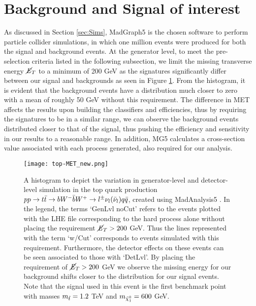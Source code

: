 \section{Background and Signal of interest}
\label{sec:production}
As discussed in Section \ref{sec:Sims}, MadGraph5 is the chosen software to perform particle collider simulations, in which one million events were produced for both the signal and background events. At the generator level, to meet the pre-selection criteria listed in the following subsection, we limit the missing transverse energy $\cancel{\it{E}}_{T}$ to a minimum of 200 GeV as the signatures significantly differ between our signal and backgrounds as seen in Figure \ref{fig:topMET}. From the histogram, it is evident that the background events have a distribution much closer to zero with a mean of roughly 50 GeV without this requirement. The difference in MET affects the results upon building the classifiers and efficiencies, thus by requiring the signatures to be in a similar range, we can observe the background events distributed closer to that of the signal, thus pushing the efficiency and sensitivity in our results to a reasonable range. In addition, MG5 calculates a cross-section value associated with each process generated, also required for our analysis. \\

\begin{figure}[htbp]
    \centering
    \texttt{[image: top-MET\_new.png]}
    \caption{A histogram to depict the variation in generator-level and detector-level simulation in the top quark production $pp \rightarrow t\Bar{t} \rightarrow bW^{-}\Bar{b}W^{+} \rightarrow l^{\pm}\nu_l(\Bar{\nu}_l)q\Bar{q}$, created using MadAnalysis5 \cite{conte2013madanalysis, conte2014designing, dumont2015toward}. In the legend, the terms `GenLvl noCut' refers to the events plotted with the LHE file corresponding to the hard process alone without placing the requirement $\cancel{\it{E}}_{T}>200$ GeV. Thus the lines represented with the term `w/Cut' corresponds to events simulated with this requirement. Furthermore, the detector effects on these events can be seen associated to those with `DetLvl'. By placing the requirement of $\cancel{\it{E}}_{T}>200$ GeV we observe the missing energy for our background shifts closer to the distribution for our signal events. Note that the signal used in this event is the first benchmark point with masses $m_{\Tilde{t}} = 1.2$ TeV and $m_{\Tilde{\chi}_1^0} = 600$ GeV.}
    \label{fig:topMET}
\end{figure}

